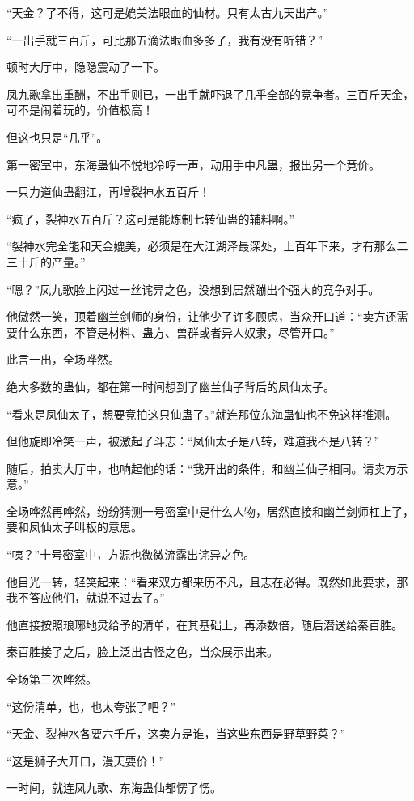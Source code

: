 \begin{this_body}
“天金？了不得，这可是媲美法眼血的仙材。只有太古九天出产。”

“一出手就三百斤，可比那五滴法眼血多多了，我有没有听错？”

顿时大厅中，隐隐震动了一下。

凤九歌拿出重酬，不出手则已，一出手就吓退了几乎全部的竞争者。三百斤天金，可不是闹着玩的，价值极高！

但这也只是“几乎”。

第一密室中，东海蛊仙不悦地冷哼一声，动用手中凡蛊，报出另一个竞价。

一只力道仙蛊翻江，再增裂神水五百斤！

“疯了，裂神水五百斤？这可是能炼制七转仙蛊的辅料啊。”

“裂神水完全能和天金媲美，必须是在大江湖泽最深处，上百年下来，才有那么二三十斤的产量。”

“嗯？”凤九歌脸上闪过一丝诧异之色，没想到居然蹦出个强大的竞争对手。

他傲然一笑，顶着幽兰剑师的身份，让他少了许多顾虑，当众开口道：“卖方还需要什么东西，不管是材料、蛊方、兽群或者异人奴隶，尽管开口。”

此言一出，全场哗然。

绝大多数的蛊仙，都在第一时间想到了幽兰仙子背后的凤仙太子。

“看来是凤仙太子，想要竞拍这只仙蛊了。”就连那位东海蛊仙也不免这样推测。

但他旋即冷笑一声，被激起了斗志：“凤仙太子是八转，难道我不是八转？”

随后，拍卖大厅中，也响起他的话：“我开出的条件，和幽兰仙子相同。请卖方示意。”

全场哗然再哗然，纷纷猜测一号密室中是什么人物，居然直接和幽兰剑师杠上了，要和凤仙太子叫板的意思。

“咦？”十号密室中，方源也微微流露出诧异之色。

他目光一转，轻笑起来：“看来双方都来历不凡，且志在必得。既然如此要求，那我不答应他们，就说不过去了。”

他直接按照琅琊地灵给予的清单，在其基础上，再添数倍，随后潜送给秦百胜。

秦百胜接了之后，脸上泛出古怪之色，当众展示出来。

全场第三次哗然。

“这份清单，也，也太夸张了吧？”

“天金、裂神水各要六千斤，这卖方是谁，当这些东西是野草野菜？”

“这是狮子大开口，漫天要价！”

一时间，就连凤九歌、东海蛊仙都愣了愣。

\end{this_body}

